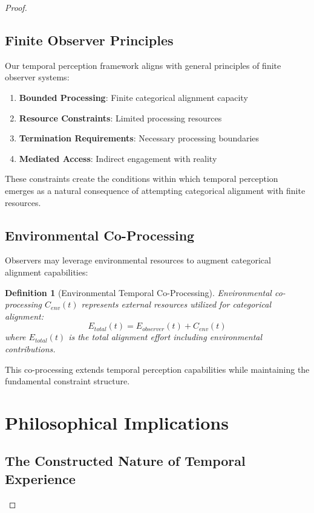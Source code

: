 \documentclass[12pt,a4paper]{article}
\newtheorem{definition}{Definition}
\begin{document}
\begin{proof}
\subsection{Finite Observer Principles}

Our temporal perception framework aligns with general principles of finite observer systems:

\begin{enumerate}
\item \textbf{Bounded Processing}: Finite categorical alignment capacity
\item \textbf{Resource Constraints}: Limited processing resources
\item \textbf{Termination Requirements}: Necessary processing boundaries
\item \textbf{Mediated Access}: Indirect engagement with reality
\end{enumerate}

These constraints create the conditions within which temporal perception emerges as a natural consequence of attempting categorical alignment with finite resources.

\subsection{Environmental Co-Processing}

Observers may leverage environmental resources to augment categorical alignment capabilities:

\begin{definition}[Environmental Temporal Co-Processing]
Environmental co-processing $C_{env}(t)$ represents external resources utilized for categorical alignment:
$$E_{total}(t) = E_{observer}(t) + C_{env}(t)$$
where $E_{total}(t)$ is the total alignment effort including environmental contributions.
\end{definition}

This co-processing extends temporal perception capabilities while maintaining the fundamental constraint structure.

\section{Philosophical Implications}

\subsection{The Constructed Nature of Temporal Experience}


\end{proof}
\end{document}
